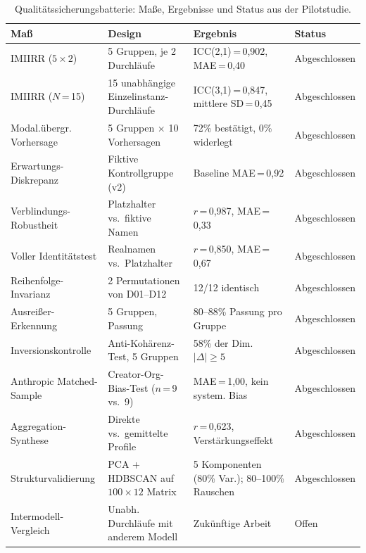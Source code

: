 \documentclass[11pt,a4paper]{article}
\begin{document}
\begin{table}[htbp]
  \centering
  \caption{Qualit\"atssicherungsbatterie: Ma\ss{}e, Ergebnisse und Status aus der Pilotstudie.}
  \label{tab:validation}
  \scriptsize
  \begin{tabular}{@{} p{3.0cm} p{4.5cm} p{4.5cm} p{1.5cm} @{}}
    \toprule
    \textbf{Ma\ss{}} & \textbf{Design} & \textbf{Ergebnis} & \textbf{Status} \\
    \midrule
    IMIIRR ($5 \times 2$) & 5 Gruppen, je 2 Durchl\"aufe & ICC(2,1)\,=\,0,902, MAE\,=\,0,40 & Abgeschlossen \\[3pt]
    IMIIRR ($N$\,=\,15) & 15 unabh\"angige Einzelinstanz-Durchl\"aufe & ICC(3,1)\,=\,0,847, mittlere SD\,=\,0,45 & Abgeschlossen \\[3pt]
    Modal.\"ubergr. Vorhersage & 5 Gruppen $\times$ 10 Vorhersagen & 72\% best\"atigt, 0\% widerlegt & Abgeschlossen \\[3pt]
    Erwartungs-Diskrepanz & Fiktive Kontrollgruppe (v2) & Baseline MAE\,=\,0,92 & Abgeschlossen \\[3pt]
    Verblindungs-Robustheit & Platzhalter vs.\ fiktive Namen & $r$\,=\,0,987, MAE\,=\,0,33 & Abgeschlossen \\[3pt]
    Voller Identit\"atstest & Realnamen vs.\ Platzhalter & $r$\,=\,0,850, MAE\,=\,0,67 & Abgeschlossen \\[3pt]
    Reihenfolge-Invarianz & 2 Permutationen von D01--D12 & 12/12 identisch & Abgeschlossen \\[3pt]
    Ausrei\ss{}er-Erkennung & 5 Gruppen, Passung & 80--88\% Passung pro Gruppe & Abgeschlossen \\[3pt]
    Inversionskontrolle & Anti-Koh\"arenz-Test, 5 Gruppen & 58\% der Dim. $|\Delta| \geq 5$ & Abgeschlossen \\[3pt]
    Anthropic Matched-Sample & Creator-Org-Bias-Test ($n$\,=\,9 vs.\ 9) & MAE\,=\,1,00, kein system. Bias & Abgeschlossen \\[3pt]
    Aggregation-Synthese & Direkte vs.\ gemittelte Profile & $r$\,=\,0,623, Verst\"arkungseffekt & Abgeschlossen \\[3pt]
    Strukturvalidierung & PCA + HDBSCAN auf $100 \times 12$ Matrix & 5 Komponenten (80\% Var.); 80--100\% Rauschen & Abgeschlossen \\[3pt]
    Intermodell-Vergleich & Unabh. Durchl\"aufe mit anderem Modell & Zuk\"unftige Arbeit & Offen \\
    \bottomrule
  \end{tabular}
\end{table}
\end{document}
